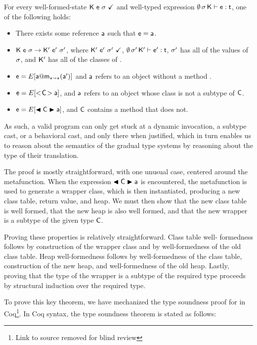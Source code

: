 \documentclass[a4paper,USenglish]{tex/lipics-v2016}
\begin{document}
\begin{theorem}

\noindent For every well-formed-state $\WFq{\K~\e~\s}$ and well-typed expression
$\EnvType\emptyset\s\K\e\t$, one of the following holds:

\begin{itemize}
\item There exists some reference $\a$ such that $\e = \a$.
\item $\K~\e~\s \Red \Kp~\ep~\sp$, where $\WFq{\Kp~\ep~\sp}$, $\EnvType\emptyset\sp\Kp\ep\t$, $\sp$ has all of the values of $\s$, and $\Kp$ has all of the classes of \K.
\item $\e=E[\DynCall\a\m\ap]$ and $\a$ refers to an object without a method \m.
\item $\e=E[\SubCast\C\a]$, and $\a$ refers to an object whose class is not a subtype of $\C$.
\item $\e=E[\BehCast\C\a]$, and $\C$ contains a method that \a does not.
\end{itemize}
\end{theorem}

As such, a valid \kafka program can only get stuck at a dynamic invocation, a
subtype cast, or a behavioral cast, and only there when justified, which in turn
enables us to reason about the semantics of the gradual type systems by reasoning
about the type of their \kafka translation.

The proof is mostly straightforward, with one unusual case, centered around
the  metafunction. When the expression $\BehCast\C\a$ is
encountered, the  metafunction is used to generate a wrapper class,
which is then instantiated, producing a new class table, return value, and
heap. We must then show that the new class table is well formed, that the new
heap is also well formed, and that the new wrapper is a subtype of the given
type $\C$. 

Proving these properties is relatively straightforward. Class table well-
formedness follows by construction of the wrapper class and by well-formedness
of the old class table. Heap well-formedness follows by well-formedness of the
class table, construction of the new heap, and well-formedness of the old heap.
Lastly, proving that the type of the wrapper is a subtype of the required type
proceeds by structural induction over the required type.

To prove this key theorem, we have mechanized the type soundness proof for
\kafka in
Coq\footnote{Link to source removed for blind review}. %
In Coq syntax, the \kafka type soundness theorem is stated as
follows:
\end{document}

